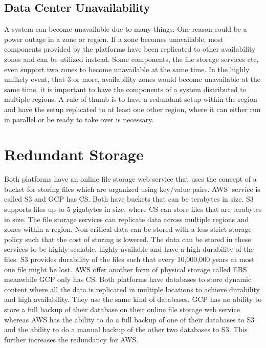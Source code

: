 \documentclass[11pt]{report}
\begin{document}
\subsection{Data Center Unavailability}
A system can become unavailable due to many things. One reason could be a power outage in a zone or region. If a zone becomes unavailable, most components provided by the platforms have been replicated to other availability zones and can be utilized instead. Some components, the file storage services etc, even support two zones to become unavailable at the same time. In the highly unlikely event, that 3 or more, availability zones would become unavailable at the same time, it is important to have the components of a system distributed to multiple regions. A rule of thumb is to have a redundant setup within the region and have the setup replicated to at least one other region, where it can either run in parallel or be ready to take over is necessary.

\section{Redundant Storage}
Both platforms have an online file storage web service that uses the concept of a bucket for storing files which are organized using key/value pairs. AWS' service is called S3 and GCP has CS. Both have buckets that can be terabytes in size. S3 supports files up to 5 gigabytes in size, where CS can store files that are terabytes in size. The file storage services can replicate data across multiple regions and zones within a region. Non-critical data can be stored with a less strict storage policy such that the cost of storing is lowered. The data can be stored in these services to be highly-scalable, highly available and have a high durability of the files. S3 provides durability of the files such that every 10,000,000 years at most one file might be lost. AWS offer another form of physical storage called EBS meanwhile GCP only has CS. Both platforms have databases to store dynamic content where all the data is replicated in multiple locations to achieve durability and high availability. They use the same kind of databases. GCP has no ability to store a full backup of their database on their online file storage web service whereas AWS has the ability to do a full backup of one of their databases to S3 and the ability to do a manual backup of the other two databases to S3. This further increases the redundancy for AWS.
\end{document}
